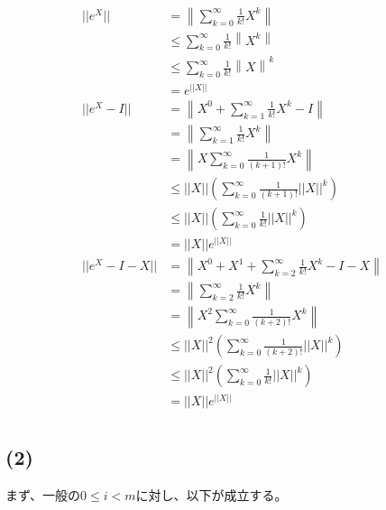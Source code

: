 \documentclass[a4paper, 10pt, dvipdfmx]{jlreq}
\begin{document}
\begin{align*}
    ||e^X||     & =\left\lVert \sum_{k=0}^\infty \frac{1}{k!}X^k\right\rVert                 \\
                & \leq \sum_{k=0}^\infty \frac{1}{k!}\left\lVert X^k\right\rVert             \\
                & \leq \sum_{k=0}^\infty \frac{1}{k!}\left\lVert X\right\rVert^k             \\
                & =e^{||X||}                                                                 \\
    ||e^X-I||   & =\left\lVert X^0+ \sum_{k=1}^\infty \frac{1}{k!}X^k -I\right\rVert         \\
                & =\left\lVert \sum_{k=1}^\infty \frac{1}{k!}X^k\right\rVert                 \\
                & =\left\lVert X\sum_{k=0}^\infty \frac{1}{(k+1)!}X^k\right\rVert            \\
                & \leq ||X||\left( \sum_{k=0}^{\infty} \frac{1}{(k+1)!} ||X||^k \right)      \\
                & \leq ||X||\left( \sum_{k=0}^{\infty} \frac{1}{k!} ||X||^k \right)          \\
                & =||X||e^{||X||}                                                            \\
    ||e^X-I-X|| & =\left\lVert X^0+X^1 +\sum_{k=2}^\infty \frac{1}{k!}X^k -I - X\right\rVert \\
                & =\left\lVert \sum_{k=2}^\infty \frac{1}{k!}X^k\right\rVert                 \\
                & =\left\lVert X^2 \sum_{k=0}^\infty \frac{1}{(k+2)!}X^k\right\rVert         \\
                & \leq ||X||^2\left( \sum_{k=0}^{\infty} \frac{1}{(k+2)!} ||X||^k \right)    \\
                & \leq ||X||^2\left( \sum_{k=0}^{\infty} \frac{1}{k!} ||X||^k \right)        \\
                & =||X||e^{||X||}                                                            \\
\end{align*}

\subsection*{(2)}

まず、一般の$0\leq i < m$に対し、以下が成立する。
\end{document}
